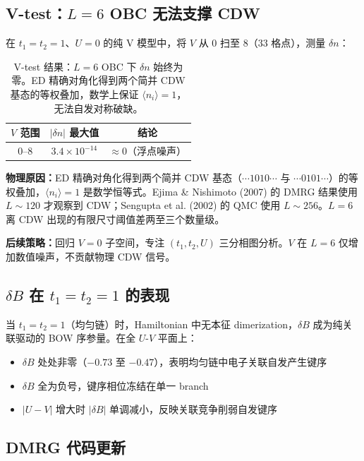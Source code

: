 \documentclass[11pt,a4paper]{article}
\begin{document}
\subsection{V-test：$L=6$ OBC 无法支撑 CDW}

在 $t_1=t_2=1$、$U=0$ 的纯 V 模型中，将 $V$ 从 0 扫至 8（33 格点），测量 $\delta n$：

\begin{table}[ht]
\centering
\begin{tabular}{c|c|c}
$V$ 范围 & $|\delta n|$ 最大值 & 结论 \\
\hline
$0$--$8$ & $3.4\times 10^{-14}$ & $\approx 0$（浮点噪声） \\
\end{tabular}
\caption{V-test 结果：$L=6$ OBC 下 $\delta n$ 始终为零。ED 精确对角化得到两个简并 CDW 基态的等权叠加，数学上保证 $\langle n_i\rangle=1$，无法自发对称破缺。}\label{tab:vtest}
\end{table}

\textbf{物理原因：}ED 精确对角化得到两个简并 CDW 基态（$\cdots1010\cdots$ 与 $\cdots0101\cdots$）的等权叠加，$\langle n_i\rangle=1$ 是数学恒等式。Ejima \& Nishimoto (2007) 的 DMRG 结果使用 $L\sim 120$ 才观察到 CDW；Sengupta et al. (2002) 的 QMC 使用 $L\sim 256$。$L=6$ 离 CDW 出现的有限尺寸阈值差两至三个数量级。

\textbf{后续策略：}回归 $V=0$ 子空间，专注 $(t_1,t_2,U)$ 三分相图分析。$V$ 在 $L=6$ 仅增加数值噪声，不贡献物理 CDW 信号。

\subsection{$\delta B$ 在 $t_1=t_2=1$ 的表现}

当 $t_1=t_2=1$（均匀链）时，Hamiltonian 中无本征 dimerization，$\delta B$ 成为纯关联驱动的 BOW 序参量。在全 $U$-$V$ 平面上：
\begin{itemize}
  \item $\delta B$ 处处非零（$-0.73$ 至 $-0.47$），表明均匀链中电子关联自发产生键序
  \item $\delta B$ 全为负号，键序相位冻结在单一 branch
  \item $|U-V|$ 增大时 $|\delta B|$ 单调减小，反映关联竞争削弱自发键序
\end{itemize}

\subsection{DMRG 代码更新}
\end{document}
